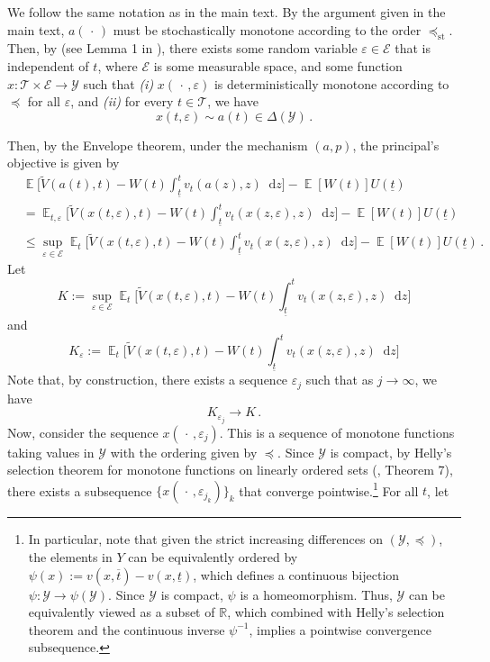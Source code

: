 \documentclass[12pt,letterpaper]{article}
\newenvironment{original}{\color{black}\noindent}{}
\theoremstyle{plain}
\theoremstyle{definition}
\theoremstyle{remark}
\DeclareMathOperator{\E}{\mathds{E}}
\newcommand{\R}{\mathds{R}}
\newcommand{\Y}{\mathcal{Y}}
\renewcommand{\1}{\mathds{1}}
\renewcommand{\epsilon}{\varepsilon}
\renewcommand*\d{\mathop{}\!\mathrm{d}}
\theoremstyle{definition}
\begin{document}
\begin{original}
We follow the same notation as in the main text. By the argument given in the main text, $a(\,\cdot\,)$ must be stochastically monotone according to the order $\preceq_{\text{st}}$. Then, by \citet{Strassen1965} (see Lemma 1 in \citealt{yang2022costly}), there exists some random variable $\epsilon \in \mathcal{E}$ that is independent of $t$, where $ \mathcal{E}$ is some measurable space, and some function $x: \mathcal{T} \times  \mathcal{E} \rightarrow \Y$ such that \textit{(i)} $x(\,\cdot\,, \epsilon)$ is deterministically monotone according to $\preceq$ for all $\epsilon$, and \textit{(ii)} for every $t \in \mathcal{T}$, we have
\[x(t, \epsilon) \sim  a(t) \in \Delta(\Y)\,. \]

Then, by the Envelope theorem, under the mechanism $(a, p)$, the principal's objective is given by
\begin{align*}
&\E\Bigg[\widetilde{V}(a(t), t) - W(t) \int_{\underline{t}}^t v_t(a(z), z) \d z \Bigg] - \E[W(t)] U(\underline{t}) \\
&=\E_{t, \epsilon}\Bigg[\widetilde{V}(x(t, \varepsilon), t) - W(t) \int_{\underline{t}}^t v_t(x(z, \varepsilon), z) \d z \Bigg] - \E[W(t)] U(\underline{t}) \\
&\leq\sup_{\varepsilon \in \mathcal{E}}\E_{t}\Bigg[\widetilde{V}(x(t, \varepsilon), t) - W(t) \int_{\underline{t}}^t v_t(x(z, \varepsilon), z) \d z \Bigg] - \E[W(t)] U(\underline{t})\,.
\end{align*}
Let
\[K:=\sup_{\varepsilon \in \mathcal{E}}\E_{t}\Bigg[\widetilde{V}(x(t, \varepsilon), t) - W(t) \int_{\underline{t}}^t v_t(x(z, \varepsilon), z) \d z \Bigg]\]
and
\[K_{\epsilon}:=\E_{t}\Bigg[\widetilde{V}(x(t, \varepsilon), t) - W(t) \int_{\underline{t}}^t v_t(x(z, \varepsilon), z) \d z \Bigg]\]
Note that, by construction, there exists a sequence $\epsilon_j$ such that as $j\rightarrow \infty$, we have
\[K_{\epsilon_j} \rightarrow K\,.\]
Now, consider the sequence $x(\,\cdot\,, \epsilon_j)$. This is a sequence of monotone functions taking values in $\Y$ with the ordering given by $\preceq$. Since $\Y$ is compact, by Helly's selection theorem for
monotone functions on linearly ordered sets (\citealt{fuchino1999theorem}, Theorem 7), there exists a subsequence $\{x(\,\cdot\,, \epsilon_{j_k})\}_k$ that converge pointwise.\footnote{In particular, note that given the strict increasing differences on $(\Y, \preceq)$, the elements in $Y$ can be equivalently ordered by $\psi(x) := v(x, \overline{t}) - v(x, \underline{t})$, which defines a continuous bijection $\psi: \Y \rightarrow \psi(\Y)$. Since $\Y$ is compact, $\psi$ is a homeomorphism. Thus, $\Y$ can be equivalently viewed as a subset of $\R$, which combined with Helly's selection theorem and the continuous inverse $\psi^{-1}$, implies a pointwise convergence subsequence.}  For all $t$, let

\end{original}
\end{document}
